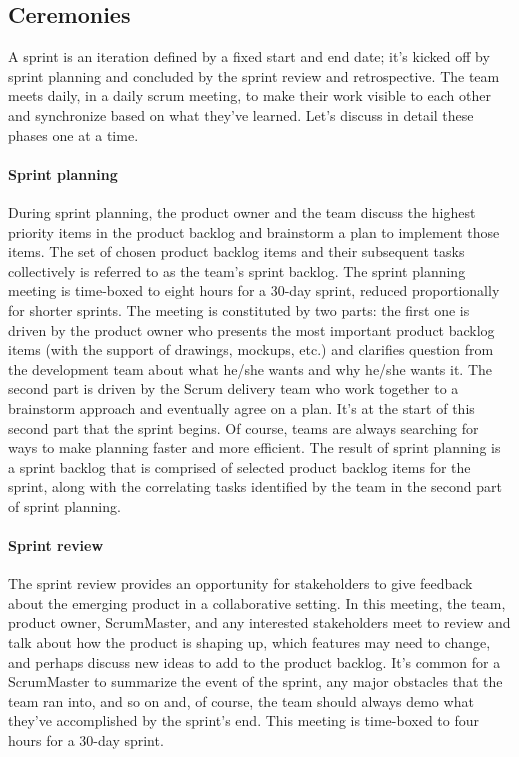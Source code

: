 \subsection{Ceremonies}
A sprint is an iteration defined by a fixed start and end date; it's kicked off by sprint planning and concluded by the sprint review and retrospective.
The team meets daily, in a daily scrum meeting, to make their work visible to each other and synchronize based on what they've learned. Let's discuss in detail these phases one at a time.

\paragraph{Sprint planning}
During sprint planning, the product owner and the team discuss the highest priority items in the product backlog and brainstorm a plan to implement those items.
The set of chosen product backlog items and their subsequent tasks collectively is referred to as the team's sprint backlog.
The sprint planning meeting is time-boxed to eight hours for a 30-day sprint, reduced proportionally for shorter sprints.
The meeting is constituted by two parts: the first one is driven by the product owner who presents the most important product backlog items (with the support of drawings, mockups, etc.) and clarifies question from the development team about what he/she wants and why he/she wants it.
The second part is driven by the Scrum delivery team who work together to a brainstorm approach and eventually agree on a plan.
It's at the start of this second part that the sprint begins.
Of course, teams are always searching for ways to make planning faster and more efficient.
The result of sprint planning is a sprint backlog that is comprised of selected product backlog items for the sprint, along with the correlating tasks identified by the team in the second part of sprint planning.

\paragraph{Sprint review}
The sprint review provides an opportunity for stakeholders to give feedback about the emerging product in a collaborative setting.
In this meeting, the team, product owner, ScrumMaster, and any interested stakeholders meet to review and talk about how the product is shaping up, which features may need to change, and perhaps discuss new ideas to add to the product backlog.
It's common for a ScrumMaster to summarize the event of the sprint, any major obstacles that the team ran into, and so on and, of course, the team should always demo what they've accomplished by the sprint's end.
This meeting is time-boxed to four hours for a 30-day sprint.

